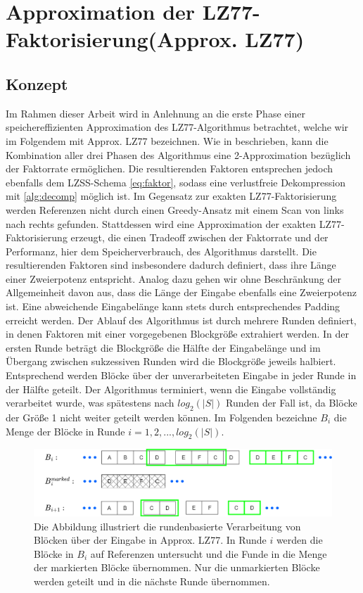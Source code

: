 \section{Approximation der LZ77-Faktorisierung(Approx. LZ77)}
\subsection{Konzept}
Im Rahmen dieser Arbeit wird in Anlehnung an \cite{ApproxLZ77} die erste Phase einer speichereffizienten Approximation des LZ77-Algorithmus betrachtet, welche wir im Folgendem
mit Approx. LZ77 bezeichnen. Wie in \cite{ApproxLZ77} beschrieben, kann die Kombination aller drei Phasen des Algorithmus eine 2-Approximation bezüglich der Faktorrate 
ermöglichen. Die resultierenden Faktoren entsprechen jedoch ebenfalls dem LZSS-Schema \ref{eq:faktor}, sodass eine verlustfreie Dekompression mit \ref{alg:decomp} möglich ist. 
Im Gegensatz zur exakten LZ77-Faktorisierung werden Referenzen nicht 
durch einen Greedy-Ansatz mit einem Scan von links nach rechts gefunden. Stattdessen wird eine Approximation der exakten LZ77-Faktorisierung erzeugt, die einen Tradeoff 
zwischen der Faktorrate und der Performanz, hier dem Speicherverbrauch, des Algorithmus darstellt. Die resultierenden Faktoren sind insbesondere dadurch definiert, dass ihre 
Länge einer Zweierpotenz entspricht. Analog dazu gehen wir ohne Beschränkung der Allgemeinheit davon aus, dass die Länge der Eingabe ebenfalls eine Zweierpotenz ist. Eine 
abweichende Eingabelänge kann stets durch entsprechendes Padding erreicht werden. 
Der Ablauf des Algorithmus ist durch mehrere Runden definiert, in denen Faktoren mit einer vorgegebenen Blockgröße extrahiert werden. In der ersten Runde beträgt die Blockgröße 
die Hälfte der Eingabelänge und im Übergang zwischen sukzessiven Runden wird die Blockgröße jeweils halbiert. Entsprechend werden Blöcke über der unverarbeiteten Eingabe
in jeder Runde in der Hälfte geteilt. Der Algorithmus terminiert, wenn die Eingabe vollständig verarbeitet wurde, was spätestens nach $log_2(|S|)$ Runden der Fall ist, da Blöcke 
der Größe 1 nicht weiter geteilt werden können. Im Folgenden bezeichne $B_i$ die Menge der Blöcke in Runde $i=1,2,...,log_2(|S|)$.
\begin{figure} [ht]
    \centering
    \includegraphics[width=1\textwidth]{Images/approxlz77.png}
    \caption{Die Abbildung illustriert die rundenbasierte Verarbeitung von Blöcken über der Eingabe in Approx. LZ77. In Runde $i$ werden die Blöcke in $B_i$ auf Referenzen untersucht und
    die Funde in die Menge der markierten Blöcke übernommen. Nur die unmarkierten Blöcke werden geteilt und in die nächste Runde übernommen.}
    \label{fig:roundapproxlz77}
\end{figure}
